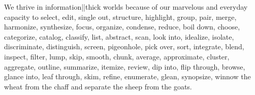 We thrive in information||thick worlds because of our 
marvelous and everyday capacity to select, edit, 
single out, structure, highlight, group, pair, merge, 
harmonize, synthesize, focus, organize, condense, 
reduce, boil down, choose, categorize, catalog, classify, 
list, abstract, scan, look into, idealize, isolate, 
discriminate, distinguish, screen, pigeonhole, pick over, 
sort, integrate, blend, inspect, filter, lump, skip, 
smooth, chunk, average, approximate, cluster, aggregate, 
outline, summarize, itemize, review, dip into, 
flip through, browse, glance into, leaf through, skim, 
refine, enumerate, glean, synopsize, winnow the wheat 
from the chaff and separate the sheep from the goats. 
